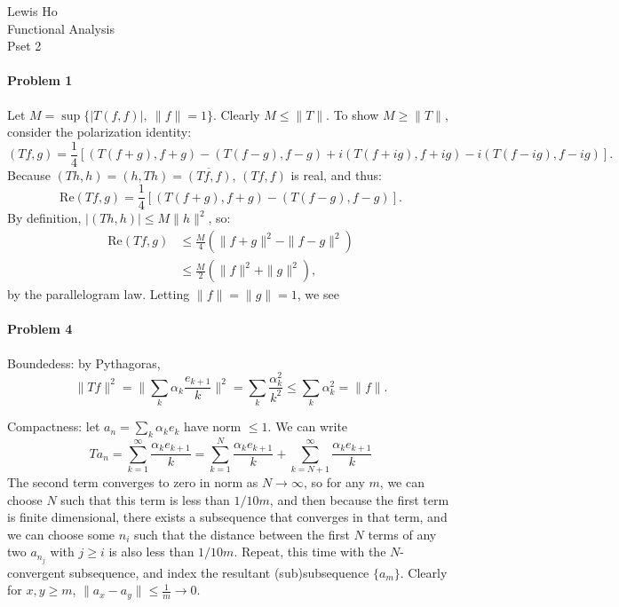 \documentclass[12pt]{article}
\begin{document}
\begin{center}
  Lewis Ho\\
  Functional Analysis\\
  Pset 2
\end{center}

\paragraph{Problem 1}
Let $M = \sup\{|T(f,f)|,\ \|f\| = 1\}$. Clearly $M \leq \|T\|$. To show $M \geq
\|T\|$, consider the polarization identity:
\begin{displaymath}
  (Tf, g) = \frac{1}{4}[(T(f+g),f+g)-(T(f-g),f-g)+i(T(f+ig),f+ig)-i(T(f-ig),
  f-ig)].
\end{displaymath}
Because $(Th,h) = (h,Th) = \overline{(Tf,f)}$, $(Tf,f)$ is real, and thus:
\begin{displaymath}
  \text{Re}(Tf,g) = \frac{1}{4}[(T(f+g),f+g)- (T(f-g),f-g)].
\end{displaymath}
By definition, $|(Th,h)|\leq M\|h\|^2$, so:
\begin{align*}
  \text{Re}(Tf,g) &\leq \frac{M}{4}(\|f+g\|^2 - \|f-g\|^2)\\
  & \leq \frac{M}{2}(\|f\|^2 + \|g\|^2),
\end{align*}
by the parallelogram law. Letting $\|f\| = \|g\| = 1$, we see 




\paragraph{Problem 4}

Boundedess: by Pythagoras,
\begin{displaymath}
  \|Tf\|^2 = \|\sum_k\alpha_k\frac{e_{k+1}}{k}\|^2 = \sum_k\frac{\alpha^2_k}{k^2}
  \leq \sum_k \alpha^2_k = \|f\|.
\end{displaymath}

Compactness: let $a_n=\sum_k\alpha_ke_k$ have norm $\leq 1$. We can write
\begin{displaymath}
  Ta_n = \sum_{k=1}^\infty\frac{\alpha_ke_{k+1}}{k} = 
  \sum_{k=1}^N\frac{\alpha_ke_{k+1}}{k} + \sum_{k=N+1}^\infty \frac{\alpha_ke_{k+1}}
  {k}
\end{displaymath}
The second term converges to zero in norm as $N \to \infty$, so for any $m$, we can
choose $N$ such that this term is less than $1/{10m}$, and then because the
first term is finite dimensional, there exists a subsequence that converges
in that term, and we can choose some $n_i$ such that the distance
between the first $N$ terms of any two $a_{n_j}$ with $j\geq i$ is also less than
$1/{10m}$. Repeat, this time with the $N$-convergent subsequence, and index
the resultant (sub)subsequence $\{a_m\}$. Clearly for $x, y \geq m$, $\|a_x
- a_y\| \leq \frac{1}{m} \to 0$.
\end{document}
